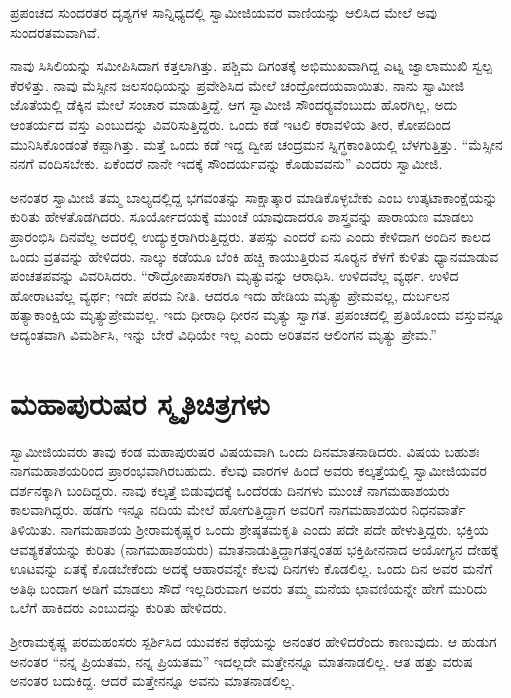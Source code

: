  ಪ್ರಪಂಚದ ಸುಂದರತರ ದೃಶ್ಯಗಳ ಸಾನ್ನಿಧ್ಯದಲ್ಲಿ ಸ್ವಾಮೀಜಿಯವರ ವಾಣಿಯನ್ನು ಆಲಿಸಿದ ಮೇಲೆ ಅವು ಸುಂದರತಮವಾಗಿವೆ. 

 ನಾವು ಸಿಸಿಲಿಯನ್ನು ಸಮೀಪಿಸಿದಾಗ ಕತ್ತಲಾಗಿತ್ತು. ಪಶ್ಚಿಮ ದಿಗಂತಕ್ಕೆ ಅಭಿಮುಖವಾಗಿದ್ದ ಎಟ್ನ ಜ್ವಾಲಾಮುಖಿ ಸ್ವಲ್ಪ ಕೆರಳಿತ್ತು. ನಾವು ಮೆಸ್ಸೀನ ಜಲಸಂಧಿಯನ್ನು ಪ್ರವೇಶಿಸಿದ ಮೇಲೆ ಚಂದ್ರೋದಯವಾಯಿತು. ನಾನು ಸ್ವಾಮೀಜಿ ಜೊತೆಯಲ್ಲಿ ಡೆಕ್ಕಿನ ಮೇಲೆ ಸಂಚಾರ ಮಾಡುತ್ತಿದ್ದೆ. ಆಗ ಸ್ವಾಮೀಜಿ ಸೌಂದರ‍್ಯವೆಂಬುದು ಹೊರಗಿಲ್ಲ, ಅದು ಆಂತರ್ಯದ ವಸ್ತು ಎಂಬುದನ್ನು ವಿವರಿಸುತ್ತಿದ್ದರು. ಒಂದು ಕಡೆ ಇಟಲಿ ಕರಾವಳಿಯ ತೀರ, ಕೋಪದಿಂದ ಮುನಿಸಿಕೊಂಡಂತೆ ಕಪ್ಪಾಗಿತ್ತು. ಮತ್ತೆ ಒಂದು ಕಡೆ ಇದ್ದ ದ್ವೀಪ ಚಂದ್ರಮನ ಸ್ನಿಗ್ಧಕಾಂತಿಯಲ್ಲಿ ಬೆಳಗುತ್ತಿತ್ತು. “ಮೆಸ್ಸೀನ ನನಗೆ ವಂದಿಸಬೇಕು. ಏಕೆಂದರೆ ನಾನೇ ಇದಕ್ಕೆ ಸೌಂದರ್ಯವನ್ನು ಕೊಡುವವನು” ಎಂದರು ಸ್ವಾಮೀಜಿ. 

 ಅನಂತರ ಸ್ವಾಮೀಜಿ ತಮ್ಮ ಬಾಲ್ಯದಲ್ಲಿದ್ದ ಭಗವಂತನ್ನು ಸಾಕ್ಷಾತ್ಕಾರ ಮಾಡಿಕೊಳ್ಳಬೇಕು ಎಂಬ ಉತ್ಕಟಾಕಾಂಕ್ಷೆಯನ್ನು ಕುರಿತು ಹೇಳತೊಡಗಿದರು. ಸೂರ್ಯೋದಯಕ್ಕೆ ಮುಂಚೆ ಯಾವುದಾದರೂ ಶಾಸ್ತ್ರವನ್ನು ಪಾರಾಯಣ ಮಾಡಲು ಪ್ರಾರಂಭಿಸಿ ದಿನವೆಲ್ಲ ಅದರಲ್ಲಿ ಉದ್ಯುಕ್ತರಾಗಿರುತ್ತಿದ್ದರು. ತಪಸ್ಸು ಎಂದರೆ ಏನು ಎಂದು ಕೇಳಿದಾಗ ಅಂದಿನ ಕಾಲದ ಒಂದು ವ್ರತವನ್ನು ಹೇಳಿದರು. ನಾಲ್ಕು ಕಡೆಯೂ ಬೆಂಕಿ ಹಚ್ಚಿ ಕಾಯುತ್ತಿರುವ ಸೂರ‍್ಯನ ಕೆಳಗೆ ಕುಳಿತು ಧ್ಯಾನಮಾಡುವ ಪಂಚತಪವನ್ನು ವಿವರಿಸಿದರು. “ರೌದ್ರೋಪಾಸಕರಾಗಿ ಮೃತ್ಯುವನ್ನು ಆರಾಧಿಸಿ. ಉಳಿದವೆಲ್ಲ ವ್ಯರ್ಥ. ಉಳಿದ ಹೋರಾಟವೆಲ್ಲ ವ್ಯರ್ಥ; ಇದೇ ಪರಮ ನೀತಿ. ಆದರೂ‌ ಇದು ಹೇಡಿಯ ಮೃತ್ಯು ಪ್ರೇಮವಲ್ಲ, ದುರ್ಬಲನ ಹತ್ಯಾಕಾಂಕ್ಷಿಯ ಮೃತ್ಯುಪ್ರೇಮವಲ್ಲ. ಇದು ಧೀರಾಧಿ ಧೀರನ ಮೃತ್ಯು ಸ್ವಾಗತ. ಪ್ರಪಂಚದಲ್ಲಿ ಪ್ರತಿಯೊಂದು ವಸ್ತುವನ್ನೂ ಆದ್ಯಂತವಾಗಿ ವಿಮರ್ಶಿಸಿ, ಇನ್ನು ಬೇರೆ ವಿಧಿಯೇ ಇಲ್ಲ ಎಂದು ಅರಿತವನ ಆಲಿಂಗನ ಮೃತ್ಯು ಪ್ರೇಮ.”


\section*{ಮಹಾಪುರುಷರ ಸ್ಮೃತಿಚಿತ್ರಗಳು}

 ಸ್ವಾಮೀಜಿಯವರು ತಾವು ಕಂಡ ಮಹಾಪುರುಷರ ವಿಷಯವಾಗಿ ಒಂದು ದಿನ\break ಮಾತನಾಡಿದರು. ವಿಷಯ ಬಹುಶಃ ನಾಗಮಹಾಶಯರಿಂದ ಪ್ರಾರಂಭವಾಗಿರಬಹುದು. ಕೆಲವು ವಾರಗಳ ಹಿಂದೆ ಅವರು ಕಲ್ಕತ್ತೆಯಲ್ಲಿ ಸ್ವಾಮೀಜಿಯವರ ದರ್ಶನಕ್ಕಾಗಿ ಬಂದಿದ್ದರು. ನಾವು ಕಲ್ಕತ್ತೆ ಬಿಡುವುದಕ್ಕೆ ಒಂದೆರಡು ದಿನಗಳು ಮುಂಚೆ ನಾಗಮಹಾಶಯರು ಕಾಲವಾಗಿದ್ದರು. ಹಡಗು ಇನ್ನೂ ನದಿಯ ಮೇಲೆ ಹೋಗುತ್ತಿದ್ದಾಗ ಅವರಿಗೆ ನಾಗಮಹಾಶಯರ ನಿಧನವಾರ್ತೆ ತಿಳಿಯಿತು. ನಾಗಮಹಾಶಯ ಶ‍್ರೀರಾಮಕೃಷ್ಣರ ಒಂದು ಶ್ರೇಷ್ಠತಮಕೃತಿ ಎಂದು ಪದೇ ಪದೇ ಹೇಳುತ್ತಿದ್ದರು. ಭಕ್ತಿಯ ಆವಶ್ಯಕತೆಯನ್ನು ಕುರಿತು (ನಾಗಮಹಾಶಯರು) ಮಾತನಾಡುತ್ತಿದ್ದಾಗ\break ತನ್ನಂತಹ ಭಕ್ತಿಹೀನನಾದ ಅಯೋಗ್ಯನ ದೇಹಕ್ಕೆ ಊಟವನ್ನು ಏತಕ್ಕೆ ಕೊಡಬೇಕೆಂದು ಅದಕ್ಕೆ ಆಹಾರವನ್ನೇ ಕೆಲವು ದಿನಗಳು ಕೊಡಲಿಲ್ಲ. ಒಂದು ದಿನ ಅವರ ಮನೆಗೆ ಅತಿಥಿ ಬಂದಾಗ ಅಡಿಗೆ ಮಾಡಲು ಸೌದೆ ಇಲ್ಲದಿರುವಾಗ ಅವರು ತಮ್ಮ ಮನೆಯ ಛಾವಣಿಯನ್ನೇ ಹೇಗೆ ಮುರಿದು ಒಲೆಗೆ ಹಾಕಿದರು ಎಂಬುದನ್ನು ಕುರಿತು ಹೇಳಿದರು. 

 ಶ‍್ರೀರಾಮಕೃಷ್ಣ ಪರಮಹಂಸರು ಸ್ಪರ್ಶಿಸಿದ ಯುವಕನ ಕಥೆಯನ್ನು ಅನಂತರ ಹೇಳಿದರೆಂದು ಕಾಣುವುದು. ಆ ಹುಡುಗ ಅನಂತರ “ನನ್ನ ಪ್ರಿಯತಮ, ನನ್ನ ಪ್ರಿಯತಮ” ಇದಲ್ಲದೇ ಮತ್ತೇನನ್ನೂ ಮಾತನಾಡಲಿಲ್ಲ. ಆತ ಹತ್ತು ವರುಷ ಅನಂತರ ಬದುಕಿದ್ದ. ಆದರೆ ಮತ್ತೇನನ್ನೂ ಅವನು ಮಾತನಾಡಲಿಲ್ಲ. 

